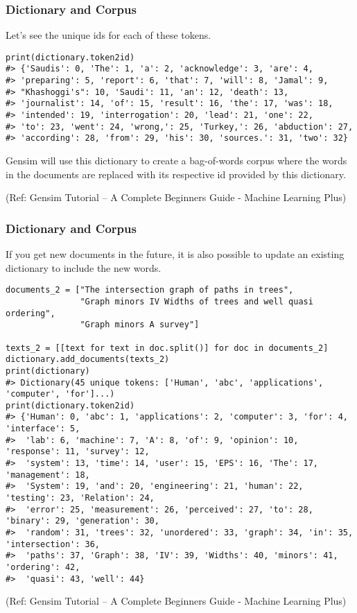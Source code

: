 \begin{frame}[fragile]\frametitle{Dictionary and Corpus}

Let’s see the unique ids for each of these tokens.

\begin{lstlisting}
print(dictionary.token2id)
#> {'Saudis': 0, 'The': 1, 'a': 2, 'acknowledge': 3, 'are': 4, 
#> 'preparing': 5, 'report': 6, 'that': 7, 'will': 8, 'Jamal': 9, 
#> "Khashoggi's": 10, 'Saudi': 11, 'an': 12, 'death': 13, 
#> 'journalist': 14, 'of': 15, 'result': 16, 'the': 17, 'was': 18, 
#> 'intended': 19, 'interrogation': 20, 'lead': 21, 'one': 22, 
#> 'to': 23, 'went': 24, 'wrong,': 25, 'Turkey,': 26, 'abduction': 27, 
#> 'according': 28, 'from': 29, 'his': 30, 'sources.': 31, 'two': 32}
\end{lstlisting}

Gensim will use this dictionary to create a bag-of-words corpus where the words in the documents are replaced with its respective id provided by this dictionary.


\tiny{(Ref: Gensim Tutorial – A Complete Beginners Guide - Machine Learning Plus)}
\end{frame}


\begin{frame}[fragile]\frametitle{Dictionary and Corpus}

If you get new documents in the future, it is also possible to update an existing dictionary to include the new words.

\begin{lstlisting}
documents_2 = ["The intersection graph of paths in trees",
               "Graph minors IV Widths of trees and well quasi ordering",
               "Graph minors A survey"]

texts_2 = [[text for text in doc.split()] for doc in documents_2]
dictionary.add_documents(texts_2)
print(dictionary)
#> Dictionary(45 unique tokens: ['Human', 'abc', 'applications', 'computer', 'for']...)
print(dictionary.token2id)
#> {'Human': 0, 'abc': 1, 'applications': 2, 'computer': 3, 'for': 4, 'interface': 5, 
#>  'lab': 6, 'machine': 7, 'A': 8, 'of': 9, 'opinion': 10, 'response': 11, 'survey': 12, 
#>  'system': 13, 'time': 14, 'user': 15, 'EPS': 16, 'The': 17, 'management': 18, 
#>  'System': 19, 'and': 20, 'engineering': 21, 'human': 22, 'testing': 23, 'Relation': 24, 
#>  'error': 25, 'measurement': 26, 'perceived': 27, 'to': 28, 'binary': 29, 'generation': 30, 
#>  'random': 31, 'trees': 32, 'unordered': 33, 'graph': 34, 'in': 35, 'intersection': 36, 
#>  'paths': 37, 'Graph': 38, 'IV': 39, 'Widths': 40, 'minors': 41, 'ordering': 42, 
#>  'quasi': 43, 'well': 44}
\end{lstlisting}

\tiny{(Ref: Gensim Tutorial – A Complete Beginners Guide - Machine Learning Plus)}
\end{frame}

